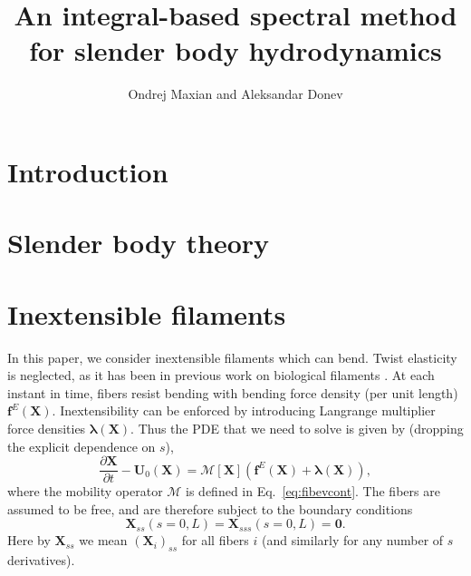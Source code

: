 \documentclass[12pt]{article}
\title{An integral-based spectral method for slender body hydrodynamics}
\author{Ondrej Maxian and Aleksandar Donev}
\newcommand{\cmt}[1]{\color{blue}#1\normalcolor}
\newcommand{\V}[1]{\boldsymbol{#1}}                 %
\newcommand{\Lop}[1]{\mathcal{#1}}
\newcommand{\bm}[1]{\boldsymbol{#1}}
\newcommand{\ind}[2]{{#1}_{#2}}
\begin{document}
\maketitle

\abstract{\cmt{To be added later.}%
}

\section{Introduction}


\section{Slender body theory}


\section{Inextensible filaments}
In this paper, we consider inextensible filaments which can bend. Twist elasticity is neglected, as it has been in previous work on biological filaments \cite{ehssan17}. At each instant in time, fibers resist bending with bending force density (per unit length) $\V{f}^E\left(\V{X}\right)$. Inextensibility can be enforced by introducing Langrange multiplier force densities $\V{\lambda}\left(\V{X}\right)$. Thus the PDE that we need to solve is given by (dropping the explicit dependence on $s$), 
\begin{equation}
\label{eq:fibPDE}
\frac{\partial \V{X}}{\partial t} - \V{U}_0(\V{X}) = \Lop{M}\left[\V{X}\right] \left(\V{f}^E\left(\V{X}\right)+\V{\lambda}\left(\V{X}\right)\right),
\end{equation}
where the mobility operator $\Lop{M}$ is defined in Eq.\ \eqref{eq:fibevcont}. The fibers are assumed to be free, and are therefore subject to the boundary conditions \cite{ts04}
\begin{equation}
\label{eq:frBCs}
\V{X}_{ss}\left(s=0,L\right)=\V{X}_{sss}\left(s=0,L\right)=\bm{0}.
\end{equation}
Here by $\V{X}_{ss}$ we mean $\left(\ind{\V{X}}{i}\right)_{ss}$ for all fibers $i$ (and similarly for any number of $s$ derivatives). 
\end{document}
